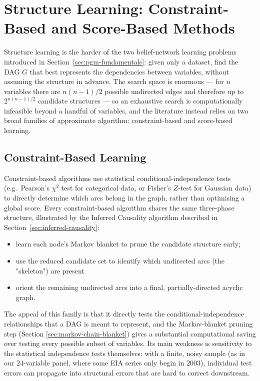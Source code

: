 \section{Structure Learning: Constraint-Based and Score-Based Methods}
\label{sec:structure-learning}

Structure learning is the harder of the two belief-network learning problems
introduced in Section~\ref{sec:pgm-fundamentals}: given only a dataset, find
the DAG $G$ that best represents the dependencies between variables, without
assuming the structure in advance. The search space is enormous — for $n$
variables there are $n(n-1)/2$ possible undirected edges and therefore up to
$2^{n(n-1)/2}$ candidate structures — so an exhaustive search is computationally
infeasible beyond a handful of variables, and the literature instead relies
on two broad families of approximate algorithm: constraint-based and score-based learning.

\subsection{Constraint-Based Learning}

Constraint-based algorithms use statistical conditional-independence tests
(e.g.\ Pearson's $\chi^2$ test for categorical data, or Fisher's $Z$-test for
Gaussian data) to directly determine which arcs belong in the graph, rather
than optimising a global score. Every constraint-based algorithm shares the
same three-phase structure, illustrated by the Inferred Causality algorithm described in Section~\ref{sec:inferred-causality}: 

\begin{itemize}
	\item learn each
	node's Markov blanket to prune the candidate structure early;
	\item use the reduced candidate set to identify which undirected arcs (the "skeleton") are present
	\item orient the remaining undirected arcs into a
	final, partially-directed acyclic graph.
\end{itemize}

The appeal of this family is that it directly tests the conditional-independence relationships that a DAG is
meant to represent, and the Markov-blanket pruning step (Section \ref{sec:markov-chain-blanket}) gives a substantial computational saving over testing every possible subset of variables. Its main weakness is sensitivity
to the statistical independence tests themselves: with a finite, noisy sample (as in our 24-variable panel, where some EIA series only begin in 2003),
individual test errors can propagate into structural errors that are hard to correct downstream.

